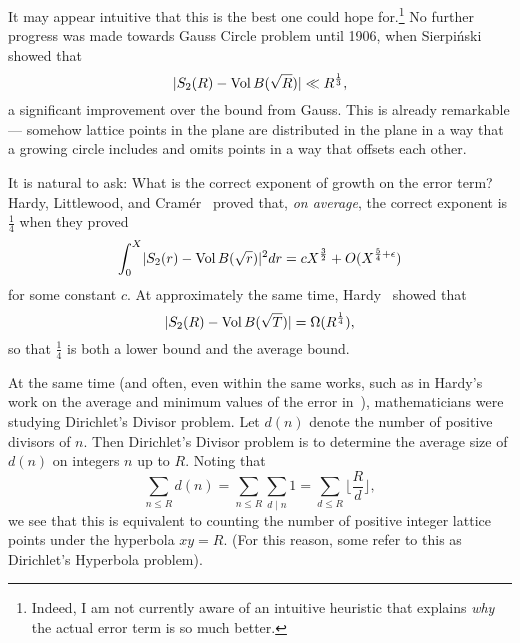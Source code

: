 It may appear intuitive that this is the best one could hope for.\footnote{Indeed, I am
  not currently aware of an intuitive heuristic that explains \emph{why} the actual error
term is so much better.}
No further progress was made towards Gauss Circle problem until 1906, when
Sierpi\'{n}ski~\cite{sierpinski1906pewnem} showed that
\begin{equation}
  \lvert S_2(R) - \operatorname*{Vol} B(\sqrt R) \rvert \ll R^{\frac{1}{3}},
\end{equation}
a significant improvement over the bound from Gauss.
This is already remarkable --- somehow lattice points in the plane are distributed in the
plane in a way that a growing circle includes and omits points in a way that offsets each
other.


It is natural to ask: What is the correct exponent of growth on the error term?
Hardy, Littlewood, and Cram\'{e}r~\cite{cramer1922} proved that, \emph{on average}, the
correct exponent is $\frac{1}{4}$ when they proved
\begin{equation}\label{eq:intro:hardy_littlewood_meansquare}
  \int_0^X \lvert S_2(r) - \operatorname*{Vol} B(\sqrt r) \rvert^2 dr = c X^{\frac{3}{2}} +
  O(X^{\frac{5}{4} + \epsilon})
\end{equation}
for some constant $c$.
At approximately the same time, Hardy~\cite{Hardy1917} showed that
\begin{equation}
  \lvert S_2(R) - \operatorname*{Vol} B(\sqrt T) \rvert = \Omega(R^{\frac{1}{4}}),
\end{equation}
so that $\frac{1}{4}$ is both a lower bound and the average bound.





At the same time (and often, even within the same works, such as in Hardy's work on the
average and minimum values of the error in~\cite{Hardy1917}), mathematicians were studying
Dirichlet's Divisor problem.
Let $d(n)$ denote the number of positive divisors of $n$.
Then Dirichlet's Divisor problem is to determine the average size of $d(n)$ on integers
$n$ up to $R$.
Noting that
\begin{equation}
  \sum_{n \leq R} d(n) =
  \sum_{n \leq R} \sum_{d \mid n} 1 =
  \sum_{d \leq R} \Big\lfloor \frac{R}{d} \Big\rfloor,
\end{equation}
we see that this is equivalent to counting the number of positive integer lattice points
under the hyperbola $xy = R$.
(For this reason, some refer to this as Dirichlet's Hyperbola problem).


